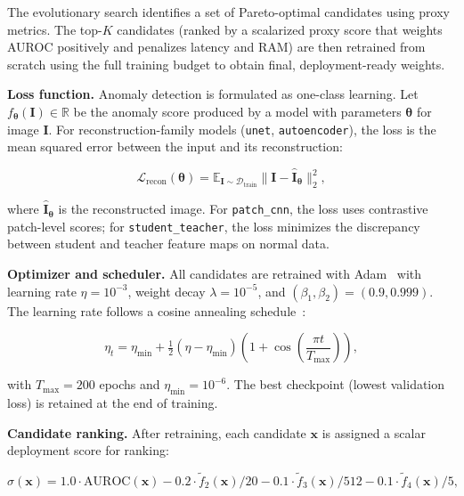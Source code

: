 \documentclass[journal]{IEEEtran}
\newcommand{\Rbb}{\mathbb{R}}
\begin{document}
The evolutionary search identifies a set of Pareto-optimal candidates using
proxy metrics.
The top-$K$ candidates (ranked by a scalarized proxy score that
weights AUROC positively and penalizes latency and RAM) are then retrained from
scratch using the full training budget to obtain final, deployment-ready weights.

\noindent\textbf{Loss function.}
Anomaly detection is formulated as one-class learning.
Let $f_{\bm{\theta}}(\bm{I}) \in \Rbb$ be the anomaly score produced by a
model with parameters $\bm{\theta}$ for image $\bm{I}$.
For reconstruction-family models (\texttt{unet}, \texttt{autoencoder}), the
loss is the mean squared error between the input and its reconstruction:

\begin{equation}
\mathcal{L}_{\mathrm{recon}}(\bm{\theta}) =
\mathbb{E}_{\bm{I} \sim \mathcal{D}_{\mathrm{train}}}
\bigl\|\bm{I} - \hat{\bm{I}}_{\bm{\theta}}\bigr\|_2^2,
\label{eq:recon_loss}
\end{equation}

where $\hat{\bm{I}}_{\bm{\theta}}$ is the reconstructed image.
For \texttt{patch\_cnn}, the loss uses contrastive patch-level scores;
for \texttt{student\_teacher}, the loss minimizes the discrepancy between
student and teacher feature maps on normal data.

\noindent\textbf{Optimizer and scheduler.}
All candidates are retrained with Adam~\cite{kingma2015adam} with learning rate
$\eta = 10^{-3}$, weight decay $\lambda = 10^{-5}$, and
$(\beta_1, \beta_2) = (0.9, 0.999)$.
The learning rate follows a cosine annealing
schedule~\cite{loshchilov2017sgdr}:

\begin{equation}
\eta_t = \eta_{\min} + \tfrac{1}{2}(\eta - \eta_{\min})
\left(1 + \cos\!\left(\frac{\pi t}{T_{\max}}\right)\right),
\label{eq:cosine}
\end{equation}

with $T_{\max} = 200$ epochs and $\eta_{\min} = 10^{-6}$.
The best checkpoint (lowest validation loss) is retained at the end of
training.

\noindent\textbf{Candidate ranking.}
After retraining, each candidate $\bm{x}$ is assigned a scalar deployment
score for ranking:

\begin{equation}
\sigma(\bm{x}) = 1.0 \cdot \mathrm{AUROC}(\bm{x})
              - 0.2 \cdot \tilde{f}_2(\bm{x}) / 20
              - 0.1 \cdot \tilde{f}_3(\bm{x}) / 512
              - 0.1 \cdot \tilde{f}_4(\bm{x}) / 5,
\label{eq:ranking_score}
\end{equation}
\end{document}
